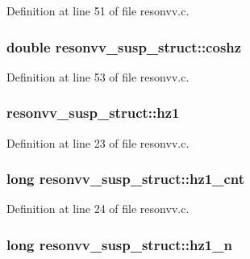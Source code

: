 Definition at line 51 of file resonvv.\+c.

\subsubsection[{\texorpdfstring{coshz}{coshz}}]{\setlength{\rightskip}{0pt plus 5cm}double resonvv\+\_\+susp\+\_\+struct\+::coshz}\hypertarget{structresonvv__susp__struct_a01d1a5527cb0608b1314002d356be055}{}\label{structresonvv__susp__struct_a01d1a5527cb0608b1314002d356be055}


Definition at line 53 of file resonvv.\+c.

\subsubsection[{\texorpdfstring{hz1}{hz1}}]{ resonvv\+\_\+susp\+\_\+struct\+::hz1}\hypertarget{structresonvv__susp__struct_a8245c0985ae57f32828544b157d6349f}{}\label{structresonvv__susp__struct_a8245c0985ae57f32828544b157d6349f}


Definition at line 23 of file resonvv.\+c.

\subsubsection[{\texorpdfstring{hz1\+\_\+cnt}{hz1_cnt}}]{\setlength{\rightskip}{0pt plus 5cm}long resonvv\+\_\+susp\+\_\+struct\+::hz1\+\_\+cnt}\hypertarget{structresonvv__susp__struct_a3a40dccd27656874e1166eaa859bdbfb}{}\label{structresonvv__susp__struct_a3a40dccd27656874e1166eaa859bdbfb}


Definition at line 24 of file resonvv.\+c.

\subsubsection[{\texorpdfstring{hz1\+\_\+n}{hz1_n}}]{\setlength{\rightskip}{0pt plus 5cm}long resonvv\+\_\+susp\+\_\+struct\+::hz1\+\_\+n}\hypertarget{structresonvv__susp__struct_a50f2c1552b479477d66c01497b94bef9}{}\label{structresonvv__susp__struct_a50f2c1552b479477d66c01497b94bef9}


